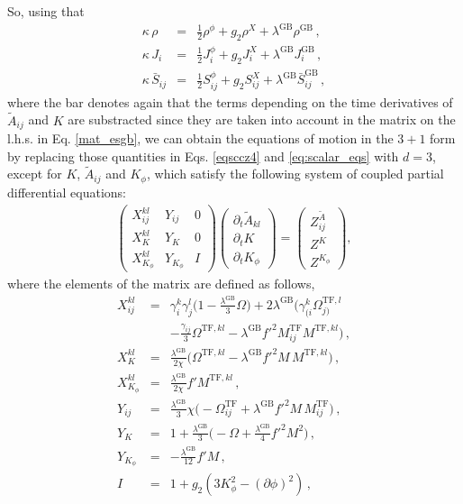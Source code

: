 \documentclass[reprint,aps,amsmath,amssymb,twoside,prd,showkeys,superscriptaddress,nofootinbib]{revtex4-2}
\begin{document}
So, using that 
\begin{subequations}
\begin{eqnarray}
\kappa\,\rho&=&\tfrac{1}{2}\rho^{\phi}+g_2\rho^X+\lambda^{\text{GB}}\rho^{\text{GB}}\,,\\ \kappa\,J_i&=&\tfrac{1}{2}J_i^{\phi}+g_2J_i^X+\lambda^{\text{GB}}J_i^{\text{GB}}\,,\\
\kappa\,\bar{S}_{ij}&=&\tfrac{1}{2}S_{ij}^{\phi}+g_2S_{ij}^X+\lambda^{\text{GB}}\bar{S}_{ij}^{\text{GB}}\,,
\end{eqnarray}
\end{subequations}
where the bar denotes again that the terms depending on the time derivatives of ${\tilde{A}}_{ij}$ and $K$ are substracted since they are taken into account in the matrix on the l.h.s. in Eq. \eqref{mat_esgb}, we can obtain the equations of motion in the $3+1$ form by replacing those quantities in Eqs. \eqref{eqsccz4} and \eqref{eq:scalar_eqs} with $d=3$, except for $K$, $\tilde{A}_{ij}$ and $K_{\phi}$, which satisfy the following system of coupled partial differential equations:
\begin{eqnarray}\label{mat_esgb}
\begin{pmatrix} X^{kl}_{ij} & Y_{ij} & 0 \\ X^{kl}_K & Y_K & 0 \\ X^{kl}_{K_{\phi}} & Y_{K_{\phi}} & I \end{pmatrix}
\begin{pmatrix} \partial_t \tilde{A}_{kl} \\ \partial_tK \\ \partial_tK_{\phi} \end{pmatrix}=
\begin{pmatrix} Z_{ij}^{\tilde{A}} \\ Z^K \\ Z^{K_{\phi}} \end{pmatrix},
\end{eqnarray}
where the elements of the matrix are defined as follows,
\begin{subequations}
\begin{eqnarray}
X_{ij}^{kl}&=& \gamma_i^k\gamma_j^l\big(1-\tfrac{\lambda^{\text{GB}}}{3}\Omega \big)+2\lambda^{\text{GB}}\big(\gamma_{(i}^k\Omega_{j)}^{\text{TF},l}\nonumber\\&& -\tfrac{\gamma_{ij}}{3}\Omega^{\text{TF},kl}-\lambda^{\text{GB}}f'^2M^{\text{TF}}_{ij}M^{\text{TF},kl}\big)\,,\\
X_K^{kl}&=&\tfrac{\lambda^{\text{GB}}}{2\chi}\big(\Omega^{\text{TF},kl}-\lambda^{\text{GB}}f'^2M\,M^{\text{TF},kl}\big)\,, \\
X_{K_{\phi}}^{kl}&=&\tfrac{\lambda^{\text{GB}}}{2\chi}f'M^{\text{TF},kl}\,, \\
Y_{ij}&=&\tfrac{\lambda^{\text{GB}}}{3}\chi\big(-\Omega^{\text{TF}}_{ij}+\lambda^{\text{GB}}f'^2M\,M^{\text{TF}}_{ij} \big)\,, \\
Y_K&=&1+\tfrac{\lambda^{\text{GB}}}{3}\big(-\Omega+\tfrac{\lambda^{\text{GB}}}{4}f'^2M^2 \big)\,,\\
Y_{K_{\phi}}&=&-\tfrac{\lambda^{\text{GB}}}{12}f'M\,, \\
I&=&1+g_2(3K_{\phi}^2-(\partial\phi)^2)\,,
\end{eqnarray}
\end{subequations}
\end{document}
